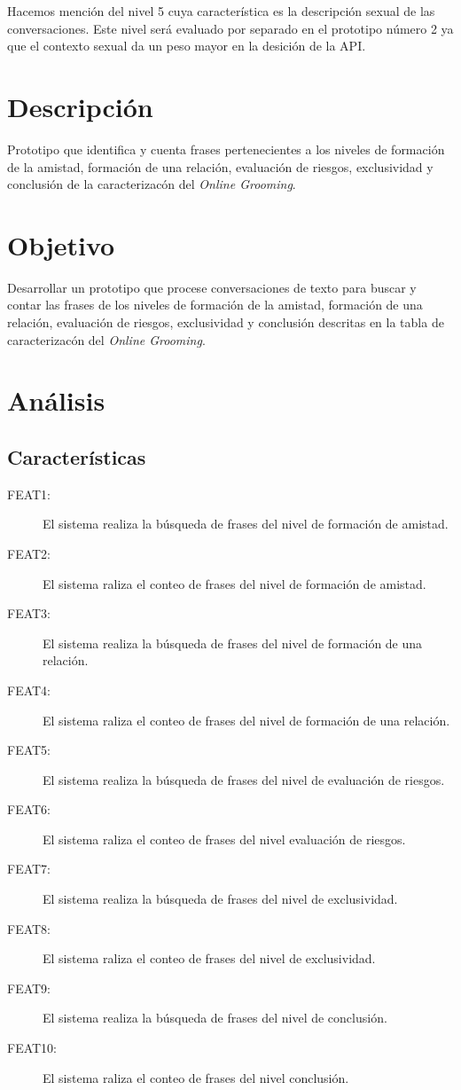 Hacemos menci\'on del nivel 5 cuya caracter\'istica es la descripci\'on sexual de las conversaciones. Este nivel ser\'a evaluado por separado en el prototipo n\'umero 2 ya que el contexto sexual da un peso mayor en la desici\'on de la API.

\section{Descripci\'on}
Prototipo que identifica y cuenta frases pertenecientes a los niveles de  formaci\'on de la amistad, formaci\'on de una relaci\'on, evaluaci\'on de riesgos, exclusividad y conclusi\'on de la caracterizac\'on del \textit{Online Grooming}.

\section{Objetivo}
Desarrollar un prototipo que procese conversaciones de texto para buscar y contar las frases de los niveles de formaci\'on de la amistad, formaci\'on de una relaci\'on, evaluaci\'on de riesgos, exclusividad y conclusi\'on descritas en la tabla de caracterizac\'on del \textit{Online Grooming}.


\section{An\'alisis}
\subsection{Caracter\'isticas}

\begin{description}
\item[FEAT1:] El sistema realiza la b\'usqueda de frases del nivel de formaci\'on de amistad.
\item[FEAT2:] El sistema raliza el conteo de frases del nivel de formaci\'on de amistad.
\item[FEAT3:] El sistema realiza la b\'usqueda de frases del nivel de formaci\'on de una relaci\'on.
\item[FEAT4:] El sistema raliza el conteo de frases del nivel de formaci\'on de una relaci\'on.
\item[FEAT5:] El sistema realiza la b\'usqueda de frases del nivel de evaluaci\'on de riesgos.
\item[FEAT6:] El sistema raliza el conteo de frases del nivel evaluaci\'on de riesgos.
\item[FEAT7:] El sistema realiza la b\'usqueda de frases del nivel de exclusividad.
\item[FEAT8:] El sistema raliza el conteo de frases del nivel de exclusividad.
\item[FEAT9:] El sistema realiza la b\'usqueda de frases del nivel de conclusi\'on.
\item[FEAT10:] El sistema raliza el conteo de frases del nivel conclusi\'on.
\end{description}

